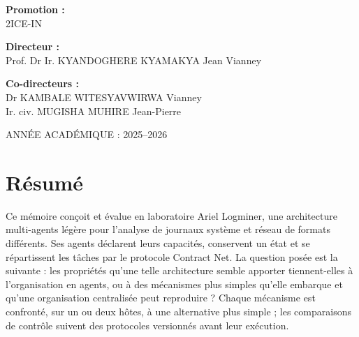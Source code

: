 \documentclass[12pt,a4paper,oneside]{report}
\newcommand{\logminer}{Logminer}
\begin{document}
\begin{titlepage}
{\begin{minipage}[t]{0.47\textwidth}
\vspace{0.3cm}

\textbf{Promotion :}\\
2ICE-IN

\end{minipage}
\hfill
\begin{minipage}[t]{0.47\textwidth}

\RaggedRight

\textbf{Directeur :}\\
Prof. Dr Ir. KYANDOGHERE KYAMAKYA Jean Vianney

\vspace{0.3cm}

\textbf{Co-directeurs :}\\
Dr KAMBALE WITESYAVWIRWA Vianney\\
Ir. civ. MUGISHA MUHIRE Jean-Pierre

\end{minipage}

}

\vfill

{\large
ANNÉE ACADÉMIQUE : 2025--2026
\par}

\end{titlepage}


\hypersetup{pageanchor=true}










\chapter*{Résumé}

Ce mémoire conçoit et évalue en laboratoire Ariel \logminer{}, une architecture multi-agents légère pour l'analyse de journaux système et réseau de formats différents. Ses agents déclarent leurs capacités, conservent un état et se répartissent les tâches par le protocole Contract Net. La question posée est la suivante : les propriétés qu'une telle architecture semble apporter tiennent-elles à l'organisation en agents, ou à des mécanismes plus simples qu'elle embarque et qu'une organisation centralisée peut reproduire ? Chaque mécanisme est confronté, sur un ou deux hôtes, à une alternative plus simple ; les comparaisons de contrôle suivent des protocoles versionnés avant leur exécution.
\end{document}
